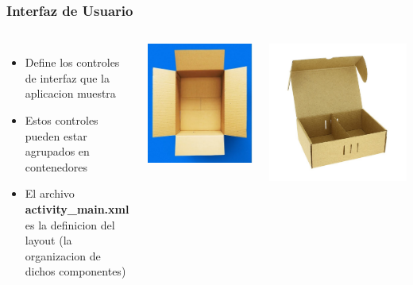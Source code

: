 \begin{frame}
\frametitle{Interfaz de Usuario}  

\begin{columns}

\begin{itemize}
\item Define los controles de interfaz que la aplicacion muestra
\item Estos controles pueden estar agrupados en contenedores
\item El archivo \textbf{activity\_main.xml} es la definicion del layout (la organizacion de dichos componentes)
\end{itemize}

\begin{columns}
\begin{center}
\includegraphics[width=0.75\linewidth]{00_Modificacion/CajaContenedora.png}    
\end{center}
\begin{center}
\includegraphics[width=0.75\linewidth]{00_Modificacion/Divisiones.jpg}    
\end{center}
\end{columns}


\end{columns}
\end{frame}

